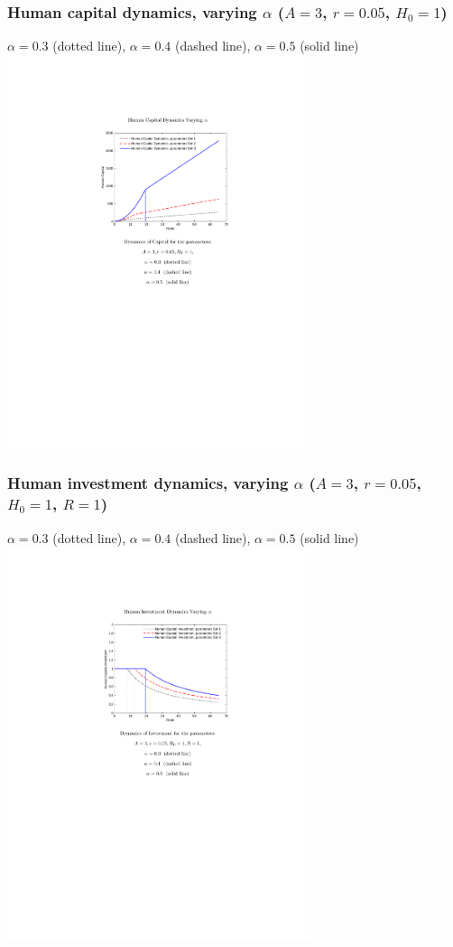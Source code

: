 \documentclass[12pt,compress,handout]{beamer}  %
\begin{document}
\begin{frame}
\frametitle{Human capital dynamics, varying $\alpha$ ($A=3$,
$r=0.05$, $H_{0}=1$)}
\begin{center}
{\footnotesize $\alpha =0.3$ (dotted line), $\alpha =0.4$ (dashed
line), $\alpha =0.5$ (solid line)}
\includegraphics[width=3.5in]{include/fig-hc-earn-series-01.pdf}
\end{center}
\end{frame}


\begin{frame}
\frametitle{Human investment dynamics, varying $\alpha$ ($A=3$,
$r=0.05$, $H_{0}=1$, $R=1$)}
\begin{center}
{\footnotesize $\alpha =0.3$ (dotted line), $\alpha =0.4$ (dashed
line), $\alpha =0.5$ (solid line)}
\includegraphics[width=3.5in]{include/fig-hc-earn-series-02.pdf}
\end{center}
\end{frame}
\end{document}
